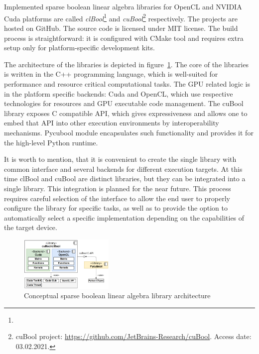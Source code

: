 \section{}



Implemented sparse boolean linear algebra libraries for OpenCL and NVIDIA Cuda platforms are called
\textit{clBool}\footnote{} and \textit{cuBool}\footnote{cuBool project: \url{https://github.com/JetBrains-Research/cuBool}. Access date: 03.02.2021.} respectively.
The projects are hosted on GitHub.
The source code is licensed under MIT license.
The build process is straightforward: it is configured with CMake tool and requires extra setup only for platform-specific development kits.

The architecture of the libraries is depicted in figure~\ref{fig:generic_architecture}.
The core of the libraries is written in the C++ programming language, which is well-suited for performance and resource critical computational tasks.
The GPU related logic is in the platform specific backends: Cuda and OpenCL, which use respective technologies for resources and GPU executable code management.
The cuBool library exposes C compatible API, which gives expressiveness and allows one to embed that API into other execution environments by interoperability mechanisms.
Pycubool module encapsulates such functionality and provides it for the high-level Python runtime.

It is worth to mention, that it is convenient to create the single library with common interface and several backends for different execution targets.
At this time clBool and cuBool are distinct libraries, but they can be integrated into a single library.
This integration is planned for the near future.
This process requires careful selection of the interface to allow the end user to properly configure the library for specific tasks, as well as to provide the option to automatically select a specific implementation depending on the capabilities of the target device.

\begin{figure}[t]
    \centering
    \includegraphics[width=0.4\textwidth]{generic_architecture.png}
    \caption{Conceptual sparse boolean linear algebra library architecture}
    \label{fig:generic_architecture}
\end{figure}

